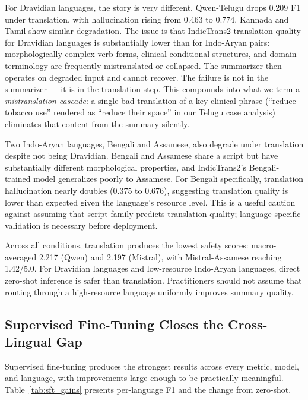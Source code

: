 \documentclass[conference]{IEEEtran}
\begin{document}
For Dravidian languages, the story is very different. Qwen-Telugu drops
0.209 F1 under translation, with hallucination rising from 0.463 to 0.774.
Kannada and Tamil show similar degradation. The issue is that IndicTrans2
translation quality for Dravidian languages is substantially lower than for
Indo-Aryan pairs: morphologically complex verb forms, clinical conditional
structures, and domain terminology are frequently mistranslated or collapsed.
The summarizer then operates on degraded input and cannot recover. The
failure is not in the summarizer --- it is in the translation step. This
compounds into what we term a \textit{mistranslation cascade}: a single bad
translation of a key clinical phrase (``reduce tobacco use'' rendered as
``reduce their space'' in our Telugu case analysis) eliminates that content
from the summary silently.

Two Indo-Aryan languages, Bengali and Assamese, also degrade under
translation despite not being Dravidian. Bengali and Assamese share a
script but have substantially different morphological properties, and
IndicTrans2's Bengali-trained model generalizes poorly to Assamese. For
Bengali specifically, translation hallucination nearly doubles (0.375 to
0.676), suggesting translation quality is lower than expected given the
language's resource level. This is a useful caution against assuming that
script family predicts translation quality; language-specific validation is
necessary before deployment.

Across all conditions, translation produces the lowest safety scores:
macro-averaged 2.217 (Qwen) and 2.197 (Mistral), with Mistral-Assamese
reaching 1.42/5.0. For Dravidian languages and low-resource Indo-Aryan
languages, direct zero-shot inference is safer than translation.
Practitioners should not assume that routing through a high-resource
language uniformly improves summary quality.

\subsection{Supervised Fine-Tuning Closes the Cross-Lingual Gap}
\label{sec:sft}

Supervised fine-tuning produces the strongest results across every metric,
model, and language, with improvements large enough to be practically
meaningful. Table~\ref{tab:sft_gains} presents per-language F1 and the
change from zero-shot.
\end{document}
